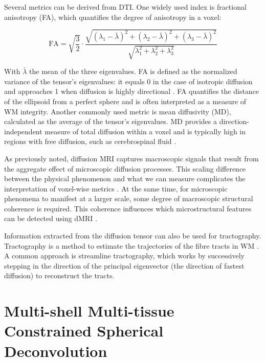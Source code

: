 Several metrics can be derived from DTI. One widely used index is fractional anisotropy (FA), which quantifies the degree of anisotropy in a voxel:

\begin{equation}
\mathrm{FA} = \sqrt{\frac{3}{2}} \cdot \frac{\sqrt{(\lambda_1 - \bar{\lambda})^2 + (\lambda_2 - \bar{\lambda})^2 + (\lambda_3 - \bar{\lambda})^2}}{\sqrt{\lambda_1^2 + \lambda_2^2 + \lambda_3^2}}
\label{eq:FA}
\end{equation}

With $\bar{\lambda}$ the mean of the three eigenvalues. FA is defined as the normalized variance of the tensor's eigenvalues: it equals 0 in the case of isotropic diffusion and approaches 1 when diffusion is highly directional \cite{Jones2013}. FA quantifies the distance of the ellipsoid from a perfect sphere and is often interpreted as a measure of WM integrity.
Another commonly used metric is mean diffusivity (MD), calculated as the average of the tensor's eigenvalues.
MD provides a direction-independent measure of total diffusion within a voxel and is typically high in regions with free diffusion, such as cerebrospinal fluid \cite{LeBihan2001}.

As previously noted, diffusion MRI captures macroscopic signals that result from the aggregate effect of microscopic diffusion processes. This scaling difference between the physical phenomenon and what we can measure complicates the interpretation of voxel-wise metrics \cite{ODonnell2011}. At the same time, for microscopic phenomena to manifest at a larger scale, some degree of macroscopic structural coherence is required. This coherence influences which microstructural features can be detected using dMRI \cite{Mori20144}.

Information extracted from the diffusion tensor can also be used for tractography. Tractography is a method to estimate the trajectories of the fibre tracts in WM \cite{Lazar2010}. A common approach is streamline tractography, which works by successively stepping in the direction of the principal eigenvector (the direction of fastest diffusion) to reconstruct the tracts.

\section{Multi-shell Multi-tissue Constrained Spherical Deconvolution}

